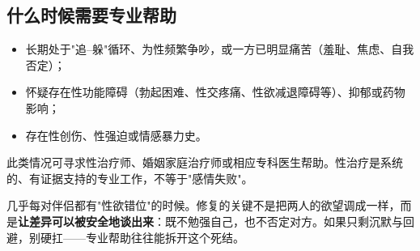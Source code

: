 \subsection{什么时候需要专业帮助}

\begin{itemize}
	\item 长期处于"追--躲"循环、为性频繁争吵，或一方已明显痛苦（羞耻、焦虑、自我否定）；
	\item 怀疑存在性功能障碍（勃起困难、性交疼痛、性欲减退障碍等）、抑郁或药物影响；
	\item 存在性创伤、性强迫或情感暴力史。
\end{itemize}

此类情况可寻求性治疗师、婚姻家庭治疗师或相应专科医生帮助。性治疗是系统的、有证据支持的专业工作，不等于"感情失败"。

\begin{tcolorbox}[colback=pink!5!white,colframe=red!50!black,title=贴心小叮咛]
几乎每对伴侣都有"性欲错位"的时候。修复的关键不是把两人的欲望调成一样，而是\textbf{让差异可以被安全地谈出来}：既不勉强自己，也不否定对方。如果只剩沉默与回避，别硬扛——专业帮助往往能拆开这个死结。
\end{tcolorbox}
